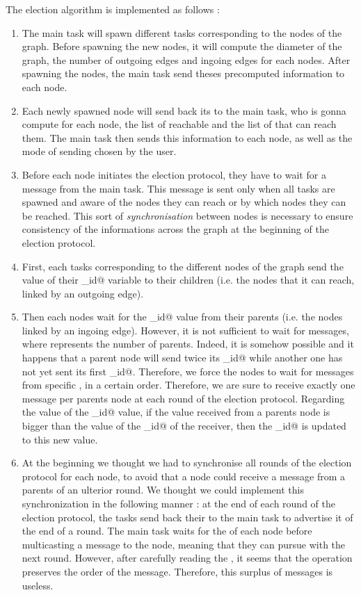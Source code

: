 \documentclass{article}
\begin{document}
The election algorithm is implemented as follows : 
\begin{enumerate}
\item The main task will spawn different \verb@pvm@ tasks corresponding to the nodes of the graph. Before spawning the new nodes, it will compute the diameter of the graph, the number of outgoing edges and ingoing edges for each nodes. After spawning the nodes, the main task send theses precomputed information to each node.
\item Each newly spawned node will send back its \verb@tid@ to the main task, who is gonna compute for each node, the list of reachable \verb@tids@ and the list of \verb@tids@ that can reach them. The main task then sends this information to each node, as well as the mode of sending chosen by the user.
\item Before each node initiates the election protocol, they have to wait for a \verb@start@ message from the main task. This message is sent only when all tasks are spawned and aware of the nodes they can reach or by which nodes they can be reached. This sort of \textit{synchronisation} between nodes is necessary to ensure consistency of the informations across the graph at the beginning of the election protocol.
\item First, each \verb@pvm@ tasks corresponding to the different nodes of the graph send the value of their \verb@max_id@ variable to their children (i.e. the nodes that it can reach, linked by an outgoing edge).
\item Then each nodes wait for the \verb@max_id@ value from their parents (i.e. the nodes linked by an ingoing edge). However, it is not sufficient to wait for \verb@n@ messages, where \verb@n@ represents the number of parents. Indeed, it is somehow possible and it happens that a parent node will send twice its \verb@max_id@ while another one has not yet sent its first \verb@max_id@. Therefore, we force the nodes to wait for messages from specific \verb@tid@, in a certain order. Therefore, we are sure to receive exactly one message per parents node at each round of the election protocol. Regarding the value of the \verb@max_id@ value, if the value received from a parents node is bigger than the value of the \verb@max_id@ of the receiver, then the \verb@max_id@ is updated to this new value.
\item At the beginning we thought we had to synchronise all rounds of the election protocol for each node, to avoid that a node could receive a message from a parents of an ulterior round. We thought we could implement this synchronization in the following manner : at the end of each round of the election protocol, the \verb@pvm@ tasks send back their \verb@tid@ to the main task to advertise it of the end of a round. The main task waits for the \verb@tid@ of each node before multicasting a \verb@go@ message to the node, meaning that they can pursue with the next round. However, after carefully reading the \verb@manpage@, it seems that the \verb@recv@ operation preserves the order of the message. Therefore, this surplus of messages is useless.

\end{enumerate}
\end{document}
